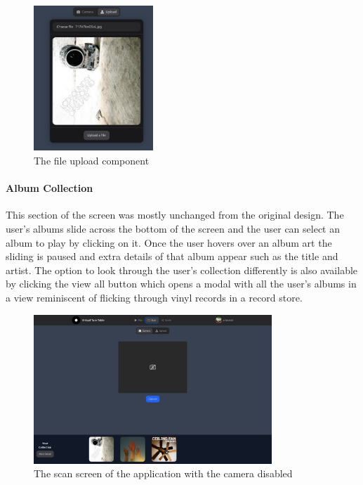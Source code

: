 \begin{figure} [H]
    \centering
    \includegraphics[width=0.4\textwidth]{figures/upload_component.png}
    \caption{The file upload component}
    \label{fig:upload_component}
\end{figure}

\paragraph{Album Collection}
This section of the screen was mostly unchanged from the original design. The user's albums slide across the bottom of the screen and the user can select an album to play by clicking on it. Once the user hovers over an album art the sliding is paused and extra details of that album appear such as the title and artist. The option to look through the user's collection differently is also available by clicking the view all button which opens a modal with all the user's albums in a view reminiscent of flicking through vinyl records in a record store.

\begin{figure} [H]
    \centering
    \includegraphics[width=0.8\textwidth]{figures/scan_screen.png}
    \caption{The scan screen of the application with the camera disabled}
    \label{fig:scan_screen}
\end{figure}

